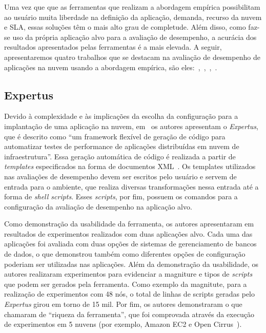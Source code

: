 Uma vez que que as ferramentas que realizam a abordagem empírica possibilitam ao usuário muita liberdade na definição da aplicação, demanda, recurso da nuvem e SLA, essas soluções têm o mais alto grau de completude. Além disso, como faz-se uso da própria aplicação alvo para a avaliação de desempenho, a acurácia dos resultados apresentados pelas ferramentas é a mais elevada. A seguir, apresentaremos quatro trabalhos que se destacam na avaliação de desempenho de aplicações na nuvem usando a abordagem empírica, são eles:~\cite{jayasinghe2012},~\cite{silva2013cloudbench},~\cite{cunhacloud},~\cite{scheuner2014cloud}.

\subsection{Expertus}
Devido à complexidade e às implicações da escolha da configuração para a implantação de uma aplicação na nuvem, em~\cite{jayasinghe2012} os autores apresentam o \textit{Expertus}, que é descrito como ``um framework flexível de geração de código para automatizar testes de performance de aplicações distribuídas em nuvem de infraestrutura''. Essa geração automática de código é realizada a partir de {\em templates} especificados na forma de documentos XML~\cite{jayasinghe2012}. Os templates utilizados nas avaliações de desempenho devem ser escritos pelo usuário e servem de entrada para o ambiente, que realiza diversas transformações nessa entrada até a forma de \textit{shell scripts}. Esses \textit{scripts}, por fim, possuem os comandos para a configuração da avaliação de desempenho na aplicação alvo.

Como demonstração da usabilidade da ferramenta, os autores apresentaram em~\cite{jayasinghe2012} resultados de experimentos realizados com duas aplicações alvo. Cada uma das aplicações foi avaliada com duas opções de sistemas de gerenciamento de bancos de dados, o que demonstrou também como diferentes opções de configuração poderiam ser utilizadas nas aplicações. Além da demonstração da usabilidade, os autores realizaram experimentos para evidenciar a magniture e tipos de \textit{scripts} que podem ser gerados pela ferramenta. Como exemplo da magnitute, para a realização de experimentos com 48 nós, o total de linhas de scripts geradas pelo \textit{Expertus} girou em torno de 15 mil. Por fim, os autores demonstraram o que chamaram de ``riqueza da ferramenta'', que foi comprovada através da execução de experimentos em 5 nuvens (por exemplo, Amazon EC2 e Open Cirrus~\cite{avetisyan2010open}).

